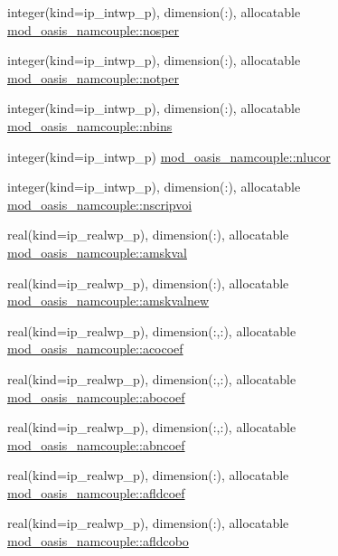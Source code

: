 \begin{DoxyCompactItemize}
\item 
integer(kind=ip\+\_\+intwp\+\_\+p), dimension(\+:), allocatable \hyperlink{namespacemod__oasis__namcouple_a484a71c213c89416924a0e23cfd46269}{mod\+\_\+oasis\+\_\+namcouple\+::nosper}
\item 
integer(kind=ip\+\_\+intwp\+\_\+p), dimension(\+:), allocatable \hyperlink{namespacemod__oasis__namcouple_ac154fc90756832bc90d02ea21f7c7e17}{mod\+\_\+oasis\+\_\+namcouple\+::notper}
\item 
integer(kind=ip\+\_\+intwp\+\_\+p), dimension(\+:), allocatable \hyperlink{namespacemod__oasis__namcouple_a4c609c48a20205e1d2aa9938d7babc92}{mod\+\_\+oasis\+\_\+namcouple\+::nbins}
\item 
integer(kind=ip\+\_\+intwp\+\_\+p) \hyperlink{namespacemod__oasis__namcouple_aee9f6849ec644ee40f465976bc6c7b96}{mod\+\_\+oasis\+\_\+namcouple\+::nlucor}
\item 
integer(kind=ip\+\_\+intwp\+\_\+p), dimension(\+:), allocatable \hyperlink{namespacemod__oasis__namcouple_abb6f67bfba2cba424dabee3a465fdfd5}{mod\+\_\+oasis\+\_\+namcouple\+::nscripvoi}
\item 
real(kind=ip\+\_\+realwp\+\_\+p), dimension(\+:), allocatable \hyperlink{namespacemod__oasis__namcouple_a92d43fa5eaaff81f0e3f73b303377c02}{mod\+\_\+oasis\+\_\+namcouple\+::amskval}
\item 
real(kind=ip\+\_\+realwp\+\_\+p), dimension(\+:), allocatable \hyperlink{namespacemod__oasis__namcouple_a3598202174da65117caf675065f8b160}{mod\+\_\+oasis\+\_\+namcouple\+::amskvalnew}
\item 
real(kind=ip\+\_\+realwp\+\_\+p), dimension(\+:,\+:), allocatable \hyperlink{namespacemod__oasis__namcouple_a115cdfe0e05679107363605a992c6386}{mod\+\_\+oasis\+\_\+namcouple\+::acocoef}
\item 
real(kind=ip\+\_\+realwp\+\_\+p), dimension(\+:,\+:), allocatable \hyperlink{namespacemod__oasis__namcouple_a1b3f80e8e19f950b806636caadeb704b}{mod\+\_\+oasis\+\_\+namcouple\+::abocoef}
\item 
real(kind=ip\+\_\+realwp\+\_\+p), dimension(\+:,\+:), allocatable \hyperlink{namespacemod__oasis__namcouple_a211c98282b89859bee6da0ef60f0d484}{mod\+\_\+oasis\+\_\+namcouple\+::abncoef}
\item 
real(kind=ip\+\_\+realwp\+\_\+p), dimension(\+:), allocatable \hyperlink{namespacemod__oasis__namcouple_a19fb86d643bb8761d5a8e32d645d5963}{mod\+\_\+oasis\+\_\+namcouple\+::afldcoef}
\item 
real(kind=ip\+\_\+realwp\+\_\+p), dimension(\+:), allocatable \hyperlink{namespacemod__oasis__namcouple_aa9d178659282698ffb6c186ff48bed3c}{mod\+\_\+oasis\+\_\+namcouple\+::afldcobo}

\end{DoxyCompactItemize}

